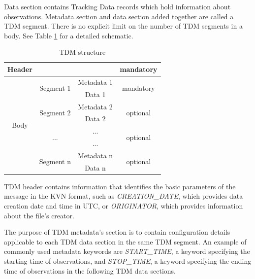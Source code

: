	Data section contains Tracking Data records which hold information about observations. Metadata section and data section added together are called a TDM segment. There is no explicit limit on the number of TDM segments in a body. See Table \ref{tab:TDMtable} for a detailed schematic.
	
\begin{table}[H]
\centering
\caption{TDM structure}
\label{tab:TDMtable}
\begin{tabular}{|c|c|c|c|}
\hline
Header                & \multicolumn{2}{c|}{}                   & mandatory                  \\ \hline
\multirow{8}{*}{Body} & \multirow{2}{*}{Segment 1} & Metadata 1 & \multirow{2}{*}{mandatory} \\ \cline{3-3}
                      &                            & Data 1     &                            \\ \cline{2-4} 
                      & \multirow{2}{*}{Segment 2} & Metadata 2 & \multirow{2}{*}{optional}  \\ \cline{3-3}
                      &                            & Data 2     &                            \\ \cline{2-4} 
                      & \multirow{2}{*}{...}       & ...        & \multirow{2}{*}{optional}  \\ \cline{3-3}
                      &                            & ...        &                            \\ \cline{2-4} 
                      & \multirow{2}{*}{Segment n} & Metadata n & \multirow{2}{*}{optional}  \\ \cline{3-3}
                      &                            & Data n     &                            \\ \hline
\end{tabular}
\end{table}

	TDM header contains information that identifies the basic parameters of the message in the KVN format, such as \emph{CREATION\_DATE}, which provides data creation date and time in UTC, or \emph{ORIGINATOR}, which provides information about the file's creator. 
	
	The purpose of TDM metadata's section is to contain configuration details applicable to each TDM data section in the same TDM segment. An example of commonly used metadata keywords are \emph{START\_TIME}, a keyword specifying the starting time of observations, and \emph{STOP\_TIME}, a keyword specifying the ending time of observations in the following TDM data sections.
	
